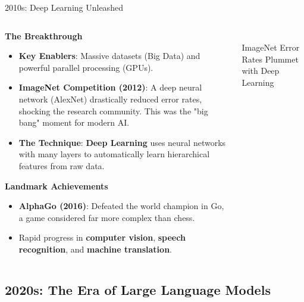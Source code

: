 \documentclass{beamer}
\begin{document}
\begin{frame}[t]{2010s: Deep Learning Unleashed}
\begin{columns}
    \begin{column}{0.6\textwidth}
        \textbf{The Breakthrough}
        \begin{itemize}
            \item \textbf{Key Enablers}: Massive datasets (Big Data) and powerful parallel processing (GPUs).
            \item \textbf{ImageNet Competition (2012)}: A deep neural network (AlexNet) drastically reduced error rates, shocking the research community. This was the "big bang" moment for modern AI.
            \item \textbf{The Technique}: \textbf{Deep Learning} uses neural networks with many layers to automatically learn hierarchical features from raw data.
        \end{itemize}
        \textbf{Landmark Achievements}
        \begin{itemize}
            \item \textbf{AlphaGo (2016)}: Defeated the world champion in Go, a game considered far more complex than chess.
            \item Rapid progress in \textbf{computer vision}, \textbf{speech recognition}, and \textbf{machine translation}.
        \end{itemize}
    \end{column}
    \begin{column}{0.4\textwidth}
        \\\scriptsize{ImageNet Error Rates Plummet with Deep Learning}
    \end{column}
\end{columns}
\end{frame}

\subsection{2020s: The Era of Large Language Models}
\end{document}
